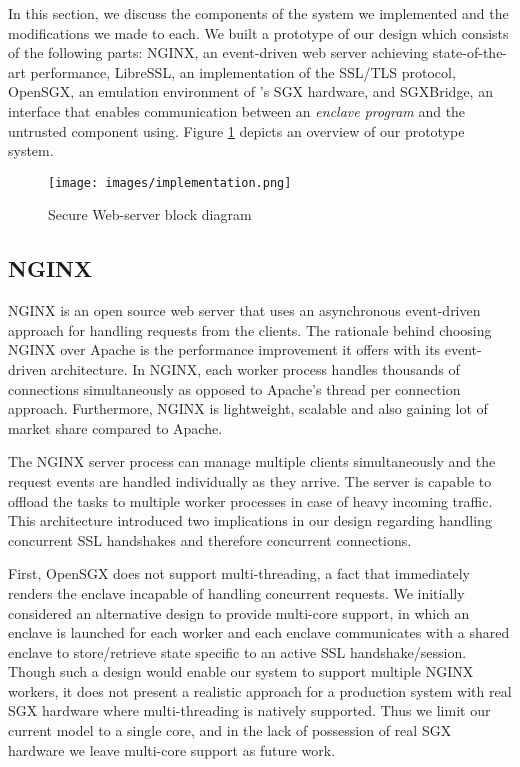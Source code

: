 \documentclass[../main.tex]{subfiles}
\begin{document}
In this section, we discuss the components of the system we
implemented and the modifications we made to each. We built a
prototype of our design which consists of the following parts: NGINX,
an event-driven web server achieving state-of-the-art performance,
LibreSSL, an implementation of the SSL/TLS protocol, OpenSGX, an
emulation environment of \Intel's SGX hardware, and SGXBridge, an
interface that enables communication between an \textit{enclave
  program} and the untrusted component using. Figure
\ref{fig:implementation-overview} depicts an overview of our prototype
system.

\begin{figure}[H]
  \centering
  \texttt{[image: images/implementation.png]}
  \caption{Secure Web-server block diagram}
  \label{fig:implementation-overview}
\end{figure}

\subsection{NGINX}

NGINX is an open source web server that uses an asynchronous
event-driven approach for handling requests from the clients. The
rationale behind choosing NGINX over Apache is the performance
improvement it offers with its event-driven architecture. In NGINX,
each worker process handles thousands of connections simultaneously as
opposed to Apache's thread per connection approach. Furthermore, NGINX
is lightweight, scalable and also gaining lot of market share compared
to Apache.

The NGINX server process can manage multiple clients simultaneously
and the request events are handled individually as they arrive. The
server is capable to offload the tasks to multiple worker processes in
case of heavy incoming traffic. This architecture introduced two
implications in our design regarding handling concurrent SSL
handshakes and therefore concurrent connections.

First, OpenSGX does not support multi-threading, a fact that
immediately renders the enclave incapable of handling concurrent
requests. We initially considered an alternative design to provide
multi-core support, in which an enclave is launched for each worker
and each enclave communicates with a shared enclave to store/retrieve
state specific to an active SSL handshake/session. Though such a
design would enable our system to support multiple NGINX workers, it
does not present a realistic approach for a production system with
real SGX hardware where multi-threading is natively supported. Thus we
limit our current model to a single core, and in the lack of
possession of real SGX hardware we leave multi-core support as future
work.
\end{document}
